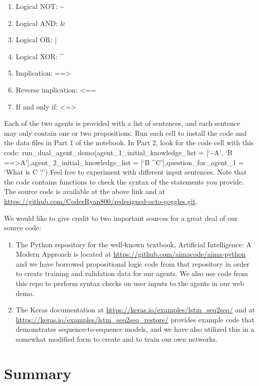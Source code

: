 \documentclass{article}
\begin{document}
\begin{enumerate}
	\item Logical NOT: \textasciitilde
	\item Logical AND: \&
	\item Logical OR: $|$
	\item Logical XOR: \textasciicircum
	\item Implication: ==\textgreater
	\item Reverse implication: \textless==
	\item If and only if: \textless=\textgreater
\end{enumerate}

Each of the two agents is provided with a list of sentences, and each sentence may only contain one or two propositions. Run each cell to install the code and the data files in Part 1 of the notebook. In Part 2, look for the code cell with this code:
run\_dual\_agent\_demo(agent\_1\_initial\_knowledge\_list = [‘\textasciitilde A’, ‘B ==\textgreater A’],agent\_2\_initial\_knowledge\_list = [‘B \textasciicircum C’],question\_for\_agent\_1 = ‘What is C ?’)
Feel free to experiment with different input sentences. Note that the code contains functions to check the syntax of the statements you provide.
The source code is available at the above link and at \url{https://github.com/CoderRyan800/redesigned-octo-goggles.git}.  

We would like to give credit to two important sources for a great deal of our source code:
\begin{enumerate}
	\item The Python repository for the well-known textbook, Artificial Intelligence: A Modern Approach \cite{aima_3rd_ed} is located at \url{https://github.com/aimacode/aima-python} \cite{aima_repo} and we have borrowed propositional logic code from that repository in order to create training and validation data for our agents. We also use code from this repo to perform syntax checks on user inputs to the agents in our web demo.
	\item The Keras \cite{chollet2015keras} documentation at \url{https://keras.io/examples/lstm_seq2seq/} and at \url{https://keras.io/examples/lstm_seq2seq_restore/} provides example code that demonstrates sequence-to-sequence models, and we have also utilized this in a somewhat modified form to create and to train our own networks.
\end{enumerate}

\section{Summary}
\end{document}
